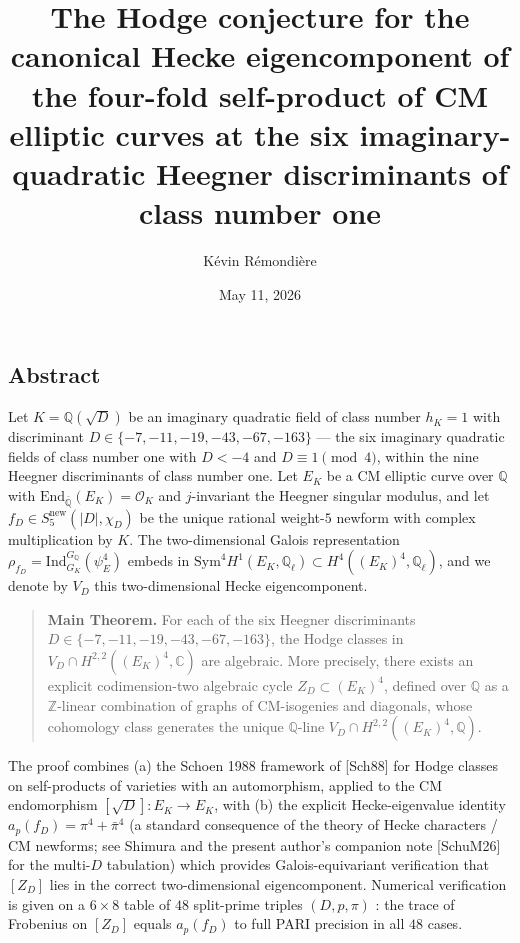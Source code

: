 \documentclass[
  11pt,
  a4paper,
]{amsart}
\title[Hodge conjecture for Hecke eigencomponent of $(E_K)^4$]{The Hodge conjecture for the canonical Hecke eigencomponent of the four-fold self-product of CM elliptic curves at the six imaginary-quadratic Heegner discriminants of class number one}
\author{K\'evin R\'emondi\`ere}
\date{May 11, 2026}
\begin{document}
\maketitle

\subsection*{Abstract}
Let \(K = \mathbb{Q}(\sqrt D)\) be an imaginary quadratic field of class number \(h_K = 1\) with discriminant \(D \in \{-7,-11,-19,-43,-67,-163\}\) --- the six imaginary quadratic fields of class number one with \(D < -4\) and \(D \equiv 1 \pmod 4\), within the nine Heegner discriminants of class number one. Let \(E_K\) be a CM elliptic curve over \(\mathbb{Q}\) with \(\mathrm{End}_{\bar{\mathbb{Q}}}(E_K) = \mathcal{O}_K\) and \(j\)-invariant the Heegner singular modulus, and let \(f_D \in S_5^{\mathrm{new}}(|D|, \chi_D)\) be the unique rational weight-\(5\) newform with complex multiplication by \(K\). The two-dimensional Galois representation \(\rho_{f_D} = \mathrm{Ind}_{G_K}^{G_\mathbb{Q}}(\psi_E^4)\) embeds in \(\mathrm{Sym}^4 H^1(E_K, \mathbb{Q}_\ell) \subset H^4((E_K)^4, \mathbb{Q}_\ell)\), and we denote by \(V_D\) this two-dimensional Hecke eigencomponent.

\begin{quote}
\textbf{Main Theorem.} For each of the six Heegner discriminants \(D \in \{-7,-11,-19,-43,-67,-163\}\), the Hodge classes in \(V_D \cap H^{2,2}((E_K)^4, \mathbb{C})\) are algebraic. More precisely, there exists an explicit codimension-two algebraic cycle \(Z_D \subset (E_K)^4\), defined over \(\mathbb{Q}\) as a \(\mathbb{Z}\)-linear combination of graphs of CM-isogenies and diagonals, whose cohomology class generates the unique \(\mathbb{Q}\)-line \(V_D \cap H^{2,2}((E_K)^4, \mathbb{Q})\).
\end{quote}

The proof combines (a) the Schoen 1988 framework of {[}Sch88{]} for Hodge classes on self-products of varieties with an automorphism, applied to the CM endomorphism \([\sqrt D] : E_K \to E_K\), with (b) the explicit Hecke-eigenvalue identity \(a_p(f_D) = \pi^4 + \bar\pi^4\) (a standard consequence of the theory of Hecke characters / CM newforms; see Shimura \cite{Shimura1971} and the present author's companion note {[}SchuM26{]} for the multi-\(D\) tabulation) which provides Galois-equivariant verification that \([Z_D]\) lies in the correct two-dimensional eigencomponent. Numerical verification is given on a \(6 \times 8\) table of \(48\) split-prime triples \((D, p, \pi)\) : the trace of Frobenius on \([Z_D]\) equals \(a_p(f_D)\) to full PARI precision in all \(48\) cases.
\end{document}
